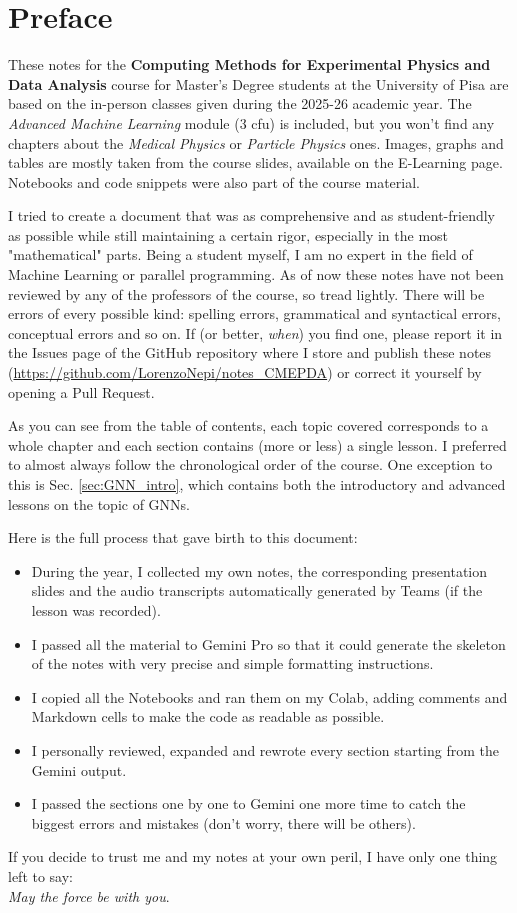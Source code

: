 \chapter*{Preface}

These notes for the \textbf{Computing Methods for Experimental Physics and Data Analysis} course for Master's Degree students at the University of Pisa are based on the in-person classes given during the 2025-26 academic year. The \textit{Advanced Machine Learning} module (3 cfu) is included, but you won't find any chapters about the \textit{Medical Physics} or \textit{Particle Physics} ones. Images, graphs and tables are mostly taken from the course slides, available on the E-Learning page. Notebooks and code snippets were also part of the course material. 

I tried to create a document that was as comprehensive and as student-friendly as possible while still maintaining a certain rigor, especially in the most "mathematical" parts. Being a student myself, I am no expert in the field of Machine Learning or parallel programming. As of now these notes have not been reviewed by any of the professors of the course, so tread lightly. There will be errors of every possible kind: spelling errors, grammatical and syntactical errors, conceptual errors and so on. If (or better, \textit{when}) you find one, please report it in the Issues page of the GitHub repository where I store and publish these notes (\url{https://github.com/LorenzoNepi/notes_CMEPDA}) or correct it yourself by opening a Pull Request. 

As you can see from the table of contents, each topic covered corresponds to a whole chapter and each section contains (more or less) a single lesson. I preferred to almost always follow the chronological order of the course. One exception to this is Sec. \ref{sec:GNN_intro}, which contains both the introductory and advanced lessons on the topic of GNNs.

Here is the full process that gave birth to this document:
\begin{itemize}
    \item[-] During the year, I collected my own notes, the corresponding presentation slides and the audio transcripts automatically generated by Teams (if the lesson was recorded).
    \item[-] I passed all the material to Gemini Pro so that it could generate the skeleton of the notes with very precise and simple formatting instructions.
    \item[-] I copied all the Notebooks and ran them on my Colab, adding comments and Markdown cells to make the code as readable as possible. 
    \item[-] I personally reviewed, expanded and rewrote every section starting from the Gemini output.
    \item[-] I passed the sections one by one to Gemini one more time to catch the biggest errors and mistakes (don't worry, there will be others).   
\end{itemize}
If you decide to trust me and my notes at your own peril, I have only one thing left to say:\\ \textit{May the force be with you}.
